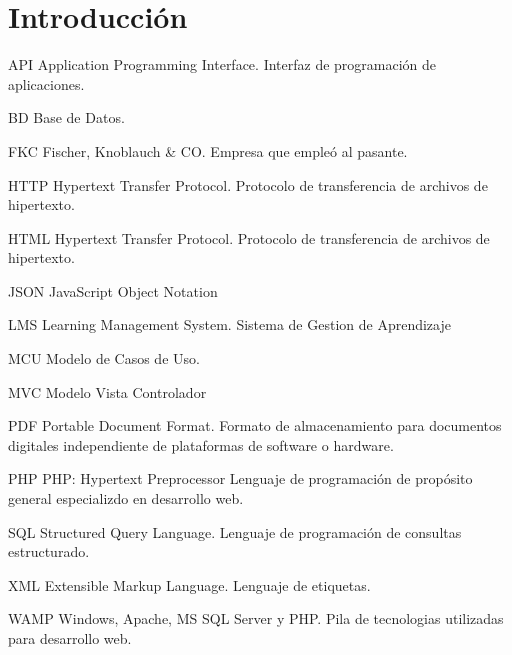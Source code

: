 \chapter*{Introducción}
\thispagestyle{empty} %

API
Application Programming Interface. Interfaz de programación de aplicaciones.

BD
Base de Datos.

FKC
Fischer, Knoblauch \& CO. Empresa que empleó al pasante.

HTTP
Hypertext Transfer Protocol. Protocolo de transferencia de archivos de hipertexto.

HTML
Hypertext Transfer Protocol. Protocolo de transferencia de archivos de hipertexto.

JSON
JavaScript Object Notation

LMS
Learning Management System. Sistema de Gestion de Aprendizaje

MCU
Modelo de Casos de Uso.

MVC
Modelo Vista Controlador

PDF Portable Document Format. 
Formato de almacenamiento para documentos digitales independiente de plataformas de software o hardware.

PHP 
PHP: Hypertext Preprocessor
Lenguaje de programación de propósito general especializdo en desarrollo web.

SQL
Structured Query Language. Lenguaje de programación de consultas estructurado.

XML
Extensible Markup Language. Lenguaje de etiquetas.

WAMP
Windows, Apache, MS SQL Server y PHP. Pila de tecnologias utilizadas para desarrollo web.